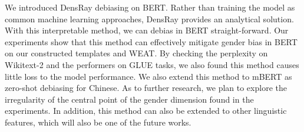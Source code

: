 We introduced DensRay debiasing on BERT. Rather than training the model as common machine learning approaches, DensRay provides an analytical solution. With this interpretable method, we can debias in BERT straight-forward. Our experiments show that this method can effectively mitigate gender bias in BERT on our constructed templates and WEAT. By checking the perplexity on Wikitext-2 and the performers on GLUE tasks, we also found this method causes little loss to the model performance. We also extend this method to mBERT as zero-shot debiasing for Chinese. As to further research, we plan to explore the irregularity of the central point of the gender dimension found in the experiments. In addition, this method can also be extended to other linguistic features, which will also be one of the future works.